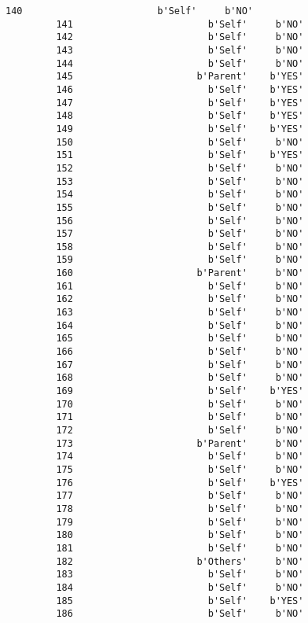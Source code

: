 \documentclass[11pt]{article}
\begin{document}
\begin{Verbatim}[commandchars=\\\{\}]
         140                        b'Self'     b'NO'  
         141                        b'Self'     b'NO'  
         142                        b'Self'     b'NO'  
         143                        b'Self'     b'NO'  
         144                        b'Self'     b'NO'  
         145                      b'Parent'    b'YES'  
         146                        b'Self'    b'YES'  
         147                        b'Self'    b'YES'  
         148                        b'Self'    b'YES'  
         149                        b'Self'    b'YES'  
         150                        b'Self'     b'NO'  
         151                        b'Self'    b'YES'  
         152                        b'Self'     b'NO'  
         153                        b'Self'     b'NO'  
         154                        b'Self'     b'NO'  
         155                        b'Self'     b'NO'  
         156                        b'Self'     b'NO'  
         157                        b'Self'     b'NO'  
         158                        b'Self'     b'NO'  
         159                        b'Self'     b'NO'  
         160                      b'Parent'     b'NO'  
         161                        b'Self'     b'NO'  
         162                        b'Self'     b'NO'  
         163                        b'Self'     b'NO'  
         164                        b'Self'     b'NO'  
         165                        b'Self'     b'NO'  
         166                        b'Self'     b'NO'  
         167                        b'Self'     b'NO'  
         168                        b'Self'     b'NO'  
         169                        b'Self'    b'YES'  
         170                        b'Self'     b'NO'  
         171                        b'Self'     b'NO'  
         172                        b'Self'     b'NO'  
         173                      b'Parent'     b'NO'  
         174                        b'Self'     b'NO'  
         175                        b'Self'     b'NO'  
         176                        b'Self'    b'YES'  
         177                        b'Self'     b'NO'  
         178                        b'Self'     b'NO'  
         179                        b'Self'     b'NO'  
         180                        b'Self'     b'NO'  
         181                        b'Self'     b'NO'  
         182                      b'Others'     b'NO'  
         183                        b'Self'     b'NO'  
         184                        b'Self'     b'NO'  
         185                        b'Self'    b'YES'  
         186                        b'Self'     b'NO'  

\end{Verbatim}
\end{document}
